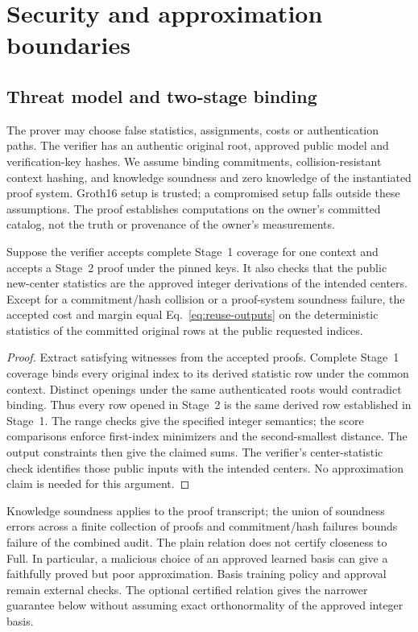 \section{Security and approximation boundaries}\label{sec:security}
\subsection{Threat model and two-stage binding}
The prover may choose false statistics, assignments, costs or authentication paths. The verifier has an authentic original root, approved public model and verification-key hashes. We assume binding commitments, collision-resistant context hashing, and knowledge soundness and zero knowledge of the instantiated proof system. Groth16 setup is trusted; a compromised setup falls outside these assumptions. The proof establishes computations on the owner's committed catalog, not the truth or provenance of the owner's measurements.

\begin{theorem}\label{thm:binding}
Suppose the verifier accepts complete Stage~1 coverage for one context and accepts a Stage~2 proof under the pinned keys. It also checks that the public new-center statistics are the approved integer derivations of the intended centers. Except for a commitment/hash collision or a proof-system soundness failure, the accepted cost and margin equal Eq.~\eqref{eq:reuse-outputs} on the deterministic statistics of the committed original rows at the public requested indices.
\end{theorem}
\begin{proof}
Extract satisfying witnesses from the accepted proofs. Complete Stage~1 coverage binds every original index to its derived statistic row under the common context. Distinct openings under the same authenticated roots would contradict binding. Thus every row opened in Stage~2 is the same derived row established in Stage~1. The range checks give the specified integer semantics; the score comparisons enforce first-index minimizers and the second-smallest distance. The output constraints then give the claimed sums. The verifier's center-statistic check identifies those public inputs with the intended centers. No approximation claim is needed for this argument.
\end{proof}

Knowledge soundness applies to the proof transcript; the union of soundness errors across a finite collection of proofs and commitment/hash failures bounds failure of the combined audit. The plain relation does not certify closeness to Full. In particular, a malicious choice of an approved learned basis can give a faithfully proved but poor approximation. Basis training policy and approval remain external checks. The optional certified relation gives the narrower guarantee below without assuming exact orthonormality of the approved integer basis.

